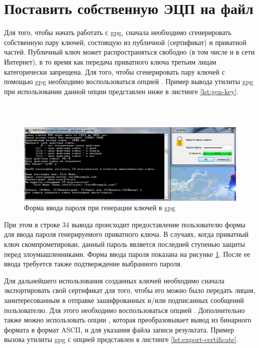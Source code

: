 \section{Поставить собственную ЭЦП на файл}

Для того, чтобы начать работать с gpg, сначала необходимо сгенерировать собственную пару ключей, состоящую из публичной (сертификат)
и приватной частей. Публичный ключ может распространяться свободно (в том числе и в сети Интернет), в то время как передача
приватного ключа третьим лицам категорически запрещена. Для того, чтобы сгенерировать пару ключей с помощью  gpg необходимо 
воспользоваться опцией . Пример вывода утилиты gpg при использовании данной опции представлен ниже в листинге 
\ref{lst:gen-key}. 
\\ \hfill \\
\inputminted[lastline=23]{console}{resources/01_gen_key}
\inputminted[firstline=25]{console}{resources/01_gen_key}

\begin{figure}[H]
    \centering
    \includegraphics[width=16cm]{resources/02_gen_key.png}
    \caption{Форма ввода пароля при генерации ключей в gpg}
    \label{fig:gen-key-password-form}
\end{figure}

При этом в строке $34$ вывода происходит предоставление пользователю формы для ввода пароля генерируемого приватного ключа. В случаях,
когда приватный ключ скомпрометирован, данный пароль является последней ступенью защиты перед злоумышленниками. Форма ввода пароля
показана на рисунке \ref{fig:gen-key-password-form}. После ее ввода требуется также подтверждение выбранного пароля.

Для дальнейшего использования созданных ключей необходимо сначала экспортировать свой сертификат для того, чтобы его можно было 
передать лицам, заинтересованным в отправке зашифрованных и/или подписанных сообщений пользователю. Для этого необходимо 
воспользоваться опцией . Дополнительно также можно использовать опции , которая преобразовывает вывод из 
бинарного формата в формат ASCII, и  для указания файла записи результата. Пример вызова утилиты gpg с опцией 
 представлен в листинге \ref{lst:export-certificate}.

